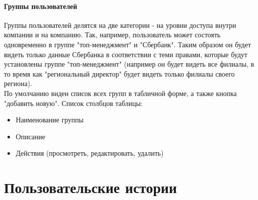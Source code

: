 \documentclass[DIV=calc, paper=a4, fontsize=11pt]{scrartcl} %
\begin{document}
\paragraph{Группы пользователей}
Группы пользователей делятся на две категории - на уровни доступа внутри компании и на компанию. Так, например, пользователь может состоять одновременно в группе "топ-менеджмент" и "Сбербанк". Таким образом он будет видеть только данные Сбербанка в соответствии с теми правами, которые будут установлены группе "топ-менеджмент" (например он будет видеть все филиалы, в то время как "региональный директор" будет видеть только филиалы своего региона).
\\[0.5cm]
По умолчанию виден список всех групп в табличной форме, а также кнопка "добавить новую". Список столбцов таблицы:

\begin{itemize}
	\item Наименование группы
	\item Описание
	\item Действия (просмотреть, редактировать, удалить)
\end{itemize}

\section{Пользовательские истории}
\end{document}
